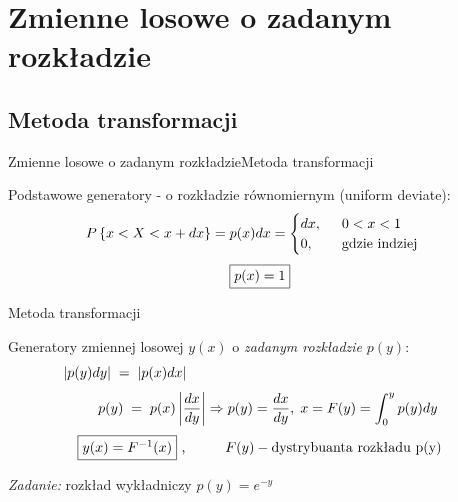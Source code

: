 \section{Zmienne losowe o zadanym rozkładzie}
\subsection{Metoda transformacji}
\begin{frame}{Zmienne losowe o zadanym rozkładzie\linebreak Metoda transformacji}
	\begin{block}{Podstawowe generatory - o rozkładzie równomiernym (uniform deviate):}
		\[
			P\left\{x < X < x + dx\right\} = p(x)dx = \begin{cases}
				dx,\hspace{0.5cm} 0 < x < 1\\
				0,\hspace{0.65cm} $ gdzie indziej$
			\end{cases}
		\]
		\[
			\fbox{$p(x) = 1$}
		\]
	\end{block}
\end{frame}
\begin{frame}{Metoda transformacji}
	\begin{block}{Generatory zmiennej losowej $y(x)$ o \textit{zadanym rozkładzie}
	$p(y)$:}
	\[
		\lvert p(y)dy \rvert \hspace{0.1cm} = \hspace{0.1cm} \lvert p(x)dx \rvert \hspace{6.8cm}
	\]
	\[
		\phantom{x} \hspace{0.2cm} p(y) \hspace{0.1cm} = \hspace{0.1cm} p(x) \left| \frac{dx}{dy} \right| \Rightarrow p(y) = \frac{dx}{dy}, \hspace{0.1cm} x = F(y) = \int_{0}^{y} p(y)dy
	\]
	\[
		\fbox{$y(x) = F^{-1}(x)$} \text{ ,} \hspace{1cm} F(y) - \text{dystrybuanta rozkładu p(y)}
	\]
	\end{block}
	\vspace{1cm}
	
	\flushright \textit{Zadanie: } rozkład wykładniczy $p(y) = e^{-y}$
\end{frame}

